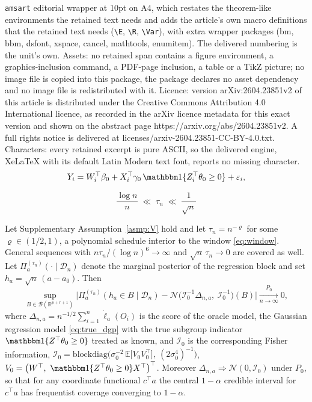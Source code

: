 \documentclass[10pt,a4paper]{amsart}
\newcommand{\E}{\mathbb{E}}
\newcommand{\R}{\mathbb{R}}
\begin{document}
\texttt{amsart} editorial wrapper at 10pt on A4, which restates the theorem-like environments the retained text needs and adds the article's own macro definitions that the retained text needs (\texttt{\textbackslash E}, \texttt{\textbackslash R}, \texttt{\textbackslash Var}), with extra wrapper packages (bm, bbm, dsfont, xspace, cancel, mathtools, enumitem). The delivered numbering is the unit's own. Assets: no retained span contains a figure environment, a graphics-inclusion command, a PDF-page inclusion, a table or a TikZ picture; no image file is copied into this package, the package declares no asset dependency and no image file is redistributed with it. Licence: version arXiv:2604.23851v2 of this article is distributed under the Creative Commons Attribution 4.0 International licence, as recorded in the arXiv licence metadata for this exact version and shown on the abstract page https://arxiv.org/abs/2604.23851v2. A full rights notice is delivered at licenses/arxiv-2604.23851-CC-BY-4.0.txt. Characters: every retained excerpt is pure ASCII, so the delivered engine, XeLaTeX with its default Latin Modern text font, reports no missing character.
\begin{equation}
Y_i=W_i^\top\beta_0+X_i^\top\gamma_0\,\mathbbm 1\{Z_i^\top\theta_0\ge0\}+\varepsilon_i,
\label{eq:true_dgp}
\end{equation}

\begin{equation}
\frac{\log n}{n}\;\ll\;\tau_n\;\ll\;\frac{1}{\sqrt n}
\label{eq:window}
\end{equation}

\begin{theorem}
\label{thm:effect_bvm}
Let Supplementary Assumption~\ref{asmp:V} hold and let $\tau_n=n^{-\varrho}$ for some $\varrho\in(1/2,1)$, a polynomial schedule interior to the window \eqref{eq:window}. General sequences with $n\tau_n/(\log n)^{6}\to\infty$ and $\sqrt n\,\tau_n\to0$ are covered as well. Let $\Pi_a^{(\tau_n)}(\cdot\mid\mathcal D_n)$ denote the marginal posterior of the regression block and set $h_a=\sqrt n\,(a-a_0)$. Then
\[
\sup_{B\in\mathcal B(\R^{p+r+1})}
\Big|\Pi_a^{(\tau_n)}(h_a\in B\mid\mathcal D_n)-\mathcal N\big(\mathcal I_0^{-1}\Delta_{n,a},\ \mathcal I_0^{-1}\big)(B)\Big|
\xrightarrow[n\to\infty]{P_0}0,
\]
where $\Delta_{n,a}=n^{-1/2}\sum_{i=1}^n\dot\ell_{a}(O_i)$ is the score of the oracle model, the Gaussian regression model \eqref{eq:true_dgp} with the true subgroup indicator $\mathbbm 1\{Z^\top\theta_0\ge0\}$ treated as known, and $\mathcal I_0$ is the corresponding Fisher information, $\mathcal I_0=\mathrm{blockdiag}\Big(\sigma_0^{-2}\,\E\big[V_0V_0^\top\big],\ (2\sigma_0^4)^{-1}\Big)$, $V_0=\big(W^\top,\ \mathbbm 1\{Z^\top\theta_0\ge0\}X^\top\big)^\top$.
Moreover $\Delta_{n,a}\Rightarrow\mathcal N(0,\mathcal I_0)$ under $P_0$, so that for any coordinate functional $c^\top a$ the central $1-\alpha$ credible interval for $c^\top a$ has frequentist coverage converging to $1-\alpha$.
\end{theorem}
\end{document}
